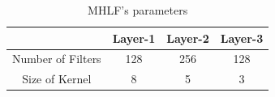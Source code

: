 \documentclass[conference]{IEEEtran}
\begin{document}
\begin{table}[tb]
\centering
\caption{MHLF's parameters}
\label{tab:fcn_para}
 \begin{tabular}{c|ccc} \hline \hline 
	   			&	Layer-1	&	Layer-2	&	Layer-3 	\\ \hline
Number of Filters		&	128	&	256	&	128		\\
Size of Kernel	&	8	&	5	&	3		\\ \hline
  \end{tabular}
\end{table}


\end{document}
